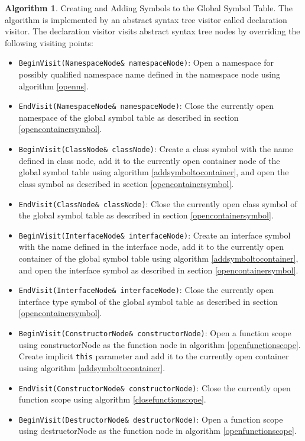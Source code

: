 \documentclass[a4paper,oneside,11pt]{book}
\theoremstyle{definition}
\newtheorem{algo}{Algorithm}[section]
\begin{document}
\begin{algo}\label{addsymbolstoglobalsymboltable} Creating and Adding Symbols to the Global Symbol Table.
The algorithm is implemented by an abstract syntax tree visitor called declaration visitor.
The declaration visitor visits abstract syntax tree nodes by overriding the following visiting points:
\begin{itemize}
\item
\verb|BeginVisit(NamespaceNode& namespaceNode)|:
Open a namespace for possibly qualified namespace name defined in the namespace node using algorithm \ref{openns}.
\item
\verb|EndVisit(NamespaceNode& namespaceNode)|:
Close the currently open namespace of the global symbol table as described in section \ref{opencontainersymbol}.
\item
\verb|BeginVisit(ClassNode& classNode)|:
Create a class symbol with the name defined in class node,
add it to the currently open container node of the global symbol table using algorithm \ref{addsymboltocontainer},
and open the class symbol as described in section \ref{opencontainersymbol}.
\item
\verb|EndVisit(ClassNode& classNode)|:
Close the currently open class symbol of the global symbol table as described in section \ref{opencontainersymbol}.
\item
\verb|BeginVisit(InterfaceNode& interfaceNode)|:
Create an interface symbol with the name defined in the interface node,
add it to the currently open container of the global symbol table using algorithm \ref{addsymboltocontainer},
and open the interface symbol as described in section \ref{opencontainersymbol}.
\item
\verb|EndVisit(InterfaceNode& interfaceNode)|:
Close the currently open interface type symbol of the global symbol table as described in section \ref{opencontainersymbol}.
\item
\verb|BeginVisit(ConstructorNode& constructorNode)|:
Open a function scope using constructorNode as the function node in algorithm \ref{openfunctionscope}.
Create implicit \verb|this| parameter and add it to the currently open container using algorithm \ref{addsymboltocontainer}.
\item
\verb|EndVisit(ConstructorNode& constructorNode)|:
Close the currently open function scope using algorithm \ref{closefunctionscope}.
\item
\verb|BeginVisit(DestructorNode& destructorNode)|:
Open a function scope using destructorNode as the function node in algorithm \ref{openfunctionscope}.

\end{itemize}
\end{algo}
\end{document}
